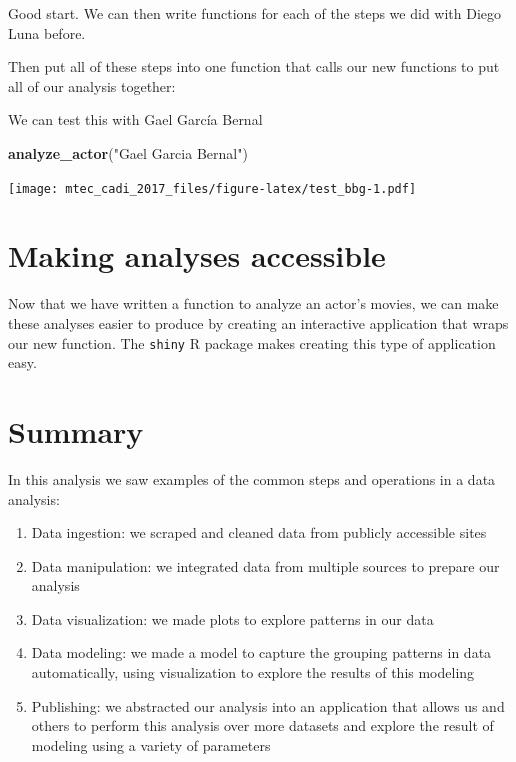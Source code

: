 \documentclass[]{book}
\newenvironment{Shaded}{\begin{snugshade}}{\end{snugshade}}
\newcommand{\KeywordTok}[1]{\textcolor[rgb]{0.13,0.29,0.53}{\textbf{#1}}}
\newcommand{\StringTok}[1]{\textcolor[rgb]{0.31,0.60,0.02}{#1}}
\newcommand{\NormalTok}[1]{#1}
\theoremstyle{definition}
\theoremstyle{definition}
\theoremstyle{remark}
\begin{document}
Good start. We can then write functions for each of the steps we did
with Diego Luna before.

Then put all of these steps into one function that calls our new
functions to put all of our analysis together:

We can test this with Gael García Bernal

\begin{Shaded}
\begin{Highlighting}[]
\KeywordTok{analyze_actor}\NormalTok{(}\StringTok{"Gael Garcia Bernal"}\NormalTok{)}
\end{Highlighting}
\end{Shaded}

\texttt{[image: mtec\_cadi\_2017\_files/figure-latex/test\_bbg-1.pdf]}

\section{Making analyses accessible}\label{making-analyses-accessible}

Now that we have written a function to analyze an actor's movies, we can
make these analyses easier to produce by creating an interactive
application that wraps our new function. The \texttt{shiny} R package
makes creating this type of application easy.

\section{Summary}\label{summary}

In this analysis we saw examples of the common steps and operations in a
data analysis:

\begin{enumerate}
\def\labelenumi{\arabic{enumi})}
\item
  Data ingestion: we scraped and cleaned data from publicly accessible
  sites
\item
  Data manipulation: we integrated data from multiple sources to prepare
  our analysis
\item
  Data visualization: we made plots to explore patterns in our data
\item
  Data modeling: we made a model to capture the grouping patterns in
  data automatically, using visualization to explore the results of this
  modeling
\item
  Publishing: we abstracted our analysis into an application that allows
  us and others to perform this analysis over more datasets and explore
  the result of modeling using a variety of parameters
\end{enumerate}
\end{document}
